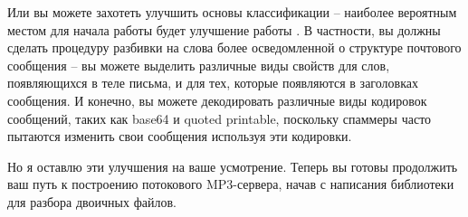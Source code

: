 Или вы можете захотеть улучшить основы классификации -- наиболее вероятным местом для
начала работы будет улучшение работы .  В частности, вы должны
сделать процедуру разбивки на слова более осведомленной о структуре почтового сообщения --
вы можете выделить различные виды свойств для слов, появляющихся в теле письма, и для тех,
которые появляются в заголовках сообщения.  И конечно, вы можете декодировать различные
виды кодировок сообщений, таких как base64 и quoted printable, поскольку спаммеры часто
пытаются изменить свои сообщения используя эти кодировки.

Но я оставлю эти улучшения на ваше усмотрение.  Теперь вы готовы продолжить ваш путь к
построению потокового MP3-сервера, начав с написания библиотеки для разбора двоичных
файлов.

